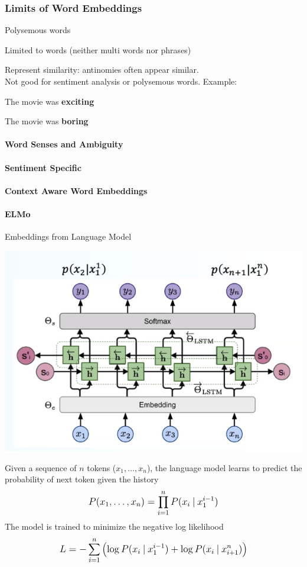 \documentclass[10pt]{report}
\begin{document}
\subsubsection{Limits of Word Embeddings} \begin{list}{}{}
	\item Polysemous words
	\item Limited to words (neither multi words nor phrases)
	\item Represent similarity: antinomies often appear similar.\\
	Not good for sentiment analysis or polysemous words. Example:
	\begin{list}{}{}
		\item The movie was \textbf{exciting}
		\item The movie was \textbf{boring}
	\end{list}
\end{list}
\paragraph{Word Senses and Ambiguity}
\paragraph{Sentiment Specific}
\paragraph{Context Aware Word Embeddings}
\paragraph{ELMo} Embeddings from Language Model
\begin{center}
	\includegraphics[scale=0.5]{8.png}
\end{center}
Given a sequence of $n$ tokens ($x_1,\ldots,x_n$), the language model learns to predict the probability of next token given the history
$$\mathlarger{P(x_1,\ldots,x_n)=\prod_{i=1}^n P(x_i\:|\:x_1^{i-1})}$$
The model is trained to minimize the negative log likelihood
$$\mathlarger{L = -\sum_{i=1}^n\left(\log P(x_i\:|\:x_1^{i-1})+\log P(x_i\:|\:x_{i+1}^n) \right)}$$
\end{document}
